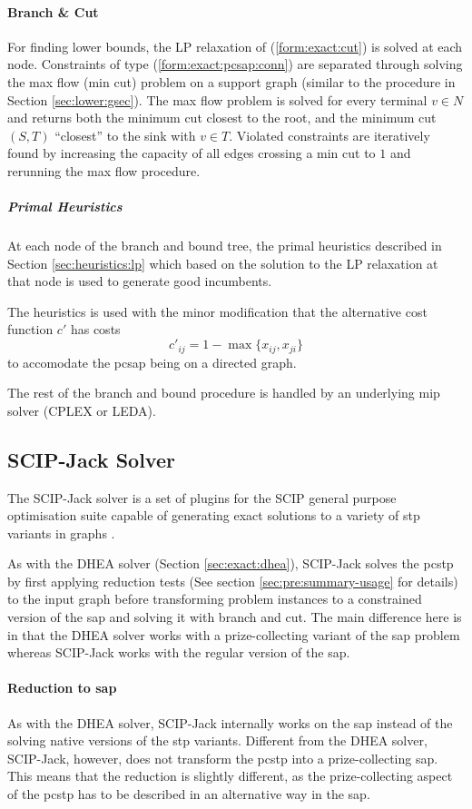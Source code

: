 \paragraph{Branch \& Cut}

For finding lower bounds, the LP relaxation of (\ref{form:exact:cut}) is solved at each node.
Constraints of type (\ref{form:exact:pcsap:conn}) are separated through solving the max flow (min cut)
problem on a support graph (similar to the procedure in Section \ref{sec:lower:gsec}). 
The max flow problem is solved for every terminal $v \in N$ and returns both the minimum cut closest to
the root, and the minimum cut $(S,T)$ ``closest'' to the sink with $v \in T$.
Violated constraints are iteratively found by increasing the
capacity of all edges crossing a min cut to $1$ and rerunning the max flow procedure.

\subparagraph{Primal Heuristics}
At each node of the branch and bound tree, the primal heuristics described in Section \ref{sec:heuristics:lp}
which based on the solution to the LP relaxation at that node
is used to generate good incumbents.

The heuristics is used with the minor modification that the alternative cost function $c'$ has
costs
$$c'_{ij} = 1 - \max\{x_{ij}, x_{ji} \}$$
to accomodate the \gls{pcsap} being on a directed graph.

The rest of the branch and bound procedure is handled by an underlying \gls{mip} solver (CPLEX or LEDA).
\subsection{SCIP-Jack Solver}
\label{sec:exact:scipj}
The SCIP-Jack solver is a set of plugins for the SCIP general purpose optimisation suite capable
of generating exact solutions to a variety of \gls{stp} variants in graphs \cite{gamrath2017scip}.

As with the DHEA solver (Section \ref{sec:exact:dhea}), SCIP-Jack solves the \gls{pcstp} by first applying
reduction tests (See section \ref{sec:pre:summary-usage} for details) to the input graph before transforming problem
instances to a constrained version of the \gls{sap} and solving it with branch and cut.
The main difference here is in that the DHEA solver works with a prize-collecting variant
 of the \gls{sap} problem whereas SCIP-Jack works with the regular version of the \gls{sap}.

\paragraph{Reduction to \gls{sap}}
As with the DHEA solver, SCIP-Jack internally works on the \gls{sap} instead of the solving native
versions of the \gls{stp} variants. Different from the DHEA solver, SCIP-Jack, however, does not
transform the \gls{pcstp} into a prize-collecting \gls{sap}. This means that the reduction is slightly
different, as the prize-collecting aspect of the \gls{pcstp} has to be described in an alternative
way in the \gls{sap}.

